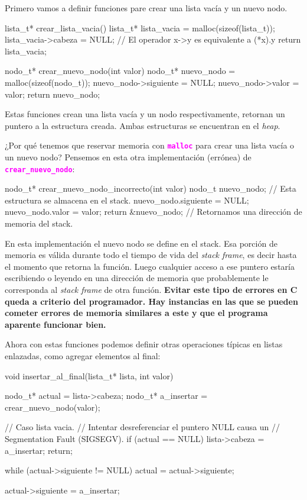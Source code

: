\documentclass[]{scrartcl}
\newcommand{\hl}[1]{\textcolor{magenta}{\textbf{\texttt{#1}}}}
\begin{document}
Primero vamos a definir funciones pare crear una lista vacía y un nuevo nodo.

\begin{cbox}[unbreakable]{}
lista_t* crear_lista_vacia() {
    lista_t* lista_vacia = malloc(sizeof(lista_t));
    lista_vacia->cabeza = NULL; // El operador x->y es equivalente a (*x).y
    return lista_vacia;
}

nodo_t* crear_nuevo_nodo(int valor) {
    nodo_t* nuevo_nodo = malloc(sizeof(nodo_t));
    nuevo_nodo->siguiente = NULL;
    nuevo_nodo->valor = valor;
    return nuevo_nodo;
}
\end{cbox}

Estas funciones crean una lista vacía y un nodo respectivamente, retornan un puntero a la estructura creada. Ambas estructuras se encuentran en el \textit{heap}.

¿Por qué tenemos que reservar memoria con \hl{malloc} para crear una lista vacía o un nuevo nodo? Pensemos en esta otra implementación (errónea) de \hl{crear\_nuevo\_nodo}:

\begin{cbox}[unbreakable]{}
nodo_t* crear_nuevo_nodo_incorrecto(int valor) {
    nodo_t nuevo_nodo; // Esta estructura se almacena en el stack.
    nuevo_nodo.siguiente = NULL;
    nuevo_nodo.valor = valor;
    return &nuevo_nodo; // Retornamos una dirección de memoria del stack.
}
\end{cbox}

En esta implementación el nuevo nodo se define en el stack. Esa porción de memoria es válida durante todo el tiempo de vida del \textit{stack frame}, es decir hasta el momento que retorna la función. Luego cualquier acceso a ese puntero estaría escribiendo o leyendo en una dirección de memoria que probablemente le corresponda al \textit{stack frame} de otra función. \textbf{Evitar este tipo de errores en C queda a criterio del programador. Hay instancias en las que se pueden cometer errores de memoria similares a este y que el programa aparente funcionar bien.}

Ahora con estas funciones podemos definir otras operaciones típicas en listas enlazadas, como agregar elementos al final:

\begin{cbox}[unbreakable]{}
void insertar_al_final(lista_t* lista, int valor) {
    nodo_t* actual = lista->cabeza;
    nodo_t* a_insertar = crear_nuevo_nodo(valor);

    // Caso lista vacia. 
    // Intentar desreferenciar el puntero NULL causa un 
    // Segmentation Fault (SIGSEGV).
    if (actual == NULL) {
        lista->cabeza = a_insertar;
        return;
    }

    while (actual->siguiente != NULL)
        actual = actual->siguiente;

    actual->siguiente = a_insertar;
}
\end{cbox}
\end{document}
